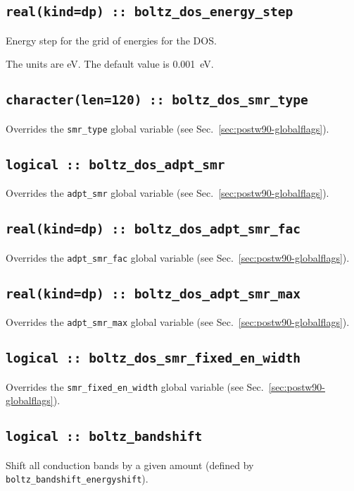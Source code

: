 \subsection[boltz\_dos\_energy\_step]{\tt real(kind=dp) :: boltz\_dos\_energy\_step}
Energy step for the grid of energies for the DOS.

The units are eV.
The default value is 0.001~eV.

\subsection[boltz\_dos\_smr\_type]{\tt character(len=120) :: boltz\_dos\_smr\_type}
Overrides the \verb#smr_type# global variable (see
Sec.~\ref{sec:postw90-globalflags}).

\subsection[boltz\_dos\_adpt\_smr]{\tt logical :: boltz\_dos\_adpt\_smr}
Overrides the \verb#adpt_smr# global variable (see
Sec.~\ref{sec:postw90-globalflags}).

\subsection[boltz\_dos\_adpt\_smr\_fac]{\tt real(kind=dp) :: boltz\_dos\_adpt\_smr\_fac}
Overrides the \verb#adpt_smr_fac# global variable (see
Sec.~\ref{sec:postw90-globalflags}).

\subsection[boltz\_dos\_adpt\_smr\_max]{\tt real(kind=dp) :: boltz\_dos\_adpt\_smr\_max}
Overrides the \verb#adpt_smr_max# global variable (see
Sec.~\ref{sec:postw90-globalflags}).

\subsection[boltz\_dos\_smr\_fixed\_en\_width]{\tt logical :: boltz\_dos\_smr\_fixed\_en\_width}
Overrides the \verb#smr_fixed_en_width# global variable (see
Sec.~\ref{sec:postw90-globalflags}).

\subsection[boltz\_bandshift]{\tt logical :: boltz\_bandshift}
Shift all conduction bands by a given amount (defined by {\tt boltz\_bandshift\_energyshift}).

